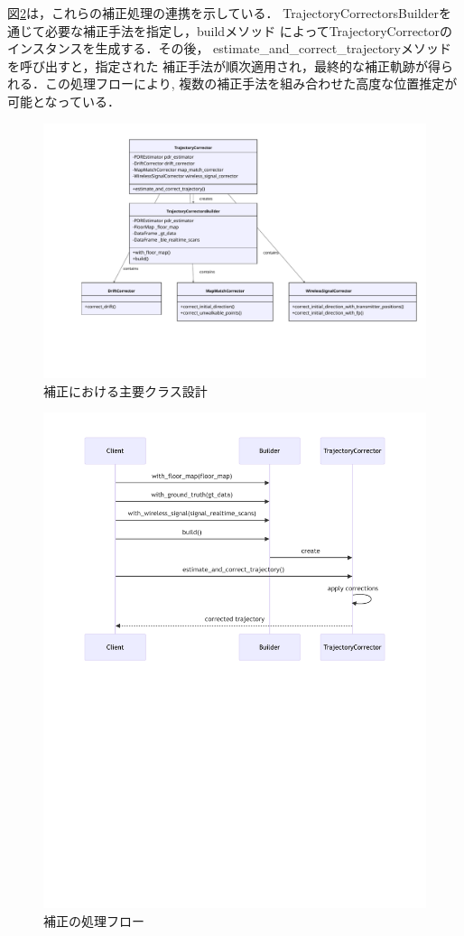 図\ref{fig:corrector-sequence}は，これらの補正処理の連携を示している．
TrajectoryCorrectorsBuilderを通じて必要な補正手法を指定し，buildメソッド
によってTrajectoryCorrectorのインスタンスを生成する．その後，
estimate\_and\_correct\_trajectoryメソッドを呼び出すと，指定された
補正手法が順次適用され，最終的な補正軌跡が得られる．この処理フローにより,
複数の補正手法を組み合わせた高度な位置推定が可能となっている．

\begin{figure}[H]
    \centering
    \includegraphics[width=\linewidth]{../image/trajectory_corrector.pdf}
    \caption{補正における主要クラス設計}
    \label{fig:corrector-class}
\end{figure}

\begin{figure}[H]
    \centering
    \includegraphics[width=\linewidth]{../image/corrector-flow-diagram.pdf}
    \caption{補正の処理フロー}
    \label{fig:corrector-sequence}
\end{figure}

